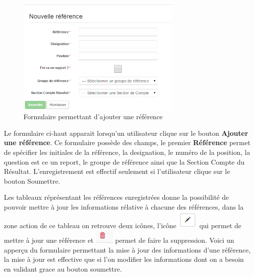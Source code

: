 \documentclass[12pt,a4paper]{report}
\begin{document}
\begin{figure}[h]
\begin{center}
\includegraphics[width=8cm]{pic/NewReference.png}
\end{center}
\caption{Formulaire permettant d'ajouter une référence}
\label{Formulaire permettant d'ajouter une référence}
\end{figure}

Le formulaire ci-haut apparait lorsqu'un utilisateur clique sur le bouton \textbf{Ajouter une référence}. Ce formulaire possède des champs, le premier \textbf{Référence} permet de spécifier les initiales de la référence, la designation, le numéro de la position, la question est ce un report, le groupe de référence ainsi que la Section Compte du Résultat.
L'enregistrement est effectif seulement si l'utilisateur clique sur le bouton Soumettre.

\newpage
Les tableaux réprésentant les références enregistrées donne la possibilité de pouvoir mettre à jour les informations rélative à chacune des références, dans la zone action de ce tableau on retrouve deux icônes, l'icône \includegraphics[scale=0.7]{pic/EditBlack.png} qui permet de mettre à jour une référence et \includegraphics[scale=0.7]{pic/DeleteWRed.png} permet de faire la suppression.
Voici un apperçu du formulaire permettant la mise à jour des informations d'une référence, la mise à jour est effective que si l'on modifier les informations dont on a besoin en validant grace au bouton soumettre. 
\end{document}
